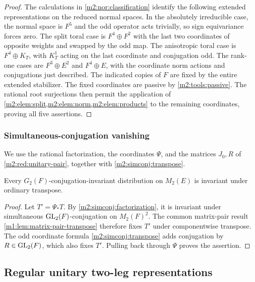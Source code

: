 \begin{proof}
The calculations in \cref{m2:nor:classification} identify the
following extended representations on the reduced normal spaces.
In the absolutely irreducible case, the normal space is $F^5$ and
the odd operator acts trivially, so sign equivariance forces zero.
The split toral case is $F^4\oplus F^2$ with the last two
coordinates of opposite weights and swapped by the odd map.
The anisotropic toral case is $F^4\oplus K_T$, with
$K_T^1$ acting on the last coordinate and conjugation odd.
The rank-one cases are $F^3\oplus E^2$ and $F^4\oplus E$,
with the coordinate norm actions and conjugations just described.
The indicated copies of $F$ are fixed by the entire extended
stabilizer. The fixed coordinates are passive by \cref{m2:tools:passive}.
The rational root surjections then permit the application of
\cref{m2:elem:split,m2:elem:norm,m2:elem:products} to the remaining
coordinates, proving all five assertions.
\end{proof}

\subsubsection{Simultaneous-conjugation vanishing}\label{m2:sec:simconj}

We use the rational factorization, the coordinates $\Psi$, and the
matrices $J_0,R$ of \cref{m2:red:unitary-pair}, together with
\eqref{m2:simconj:transpose}.

\begin{theorem}\label{m2:simconj:vanishing}
Every $G_2(F)$-conjugation-invariant distribution on $M_2(E)$
is invariant under ordinary transpose.
\end{theorem}

\begin{proof}
Let $T'=\Psi_*T$. By \cref{m2:simconj:factorization}, it is invariant
under simultaneous $\operatorname{GL}_2(F)$-conjugation on $M_2(F)^2$.
The common matrix-pair result \cref{m1:lem:matrix-pair-transpose}
therefore fixes $T'$ under componentwise transpose. The odd
coordinate formula \eqref{m2:simconj:transpose} adds conjugation by
$R\in\operatorname{GL}_2(F)$, which also fixes $T'$. Pulling back through $\Psi$
proves the assertion.
\end{proof}

\subsection{Regular unitary two-leg representations}\label{m2:leg:section}\label{m2:sec:twoleg}

